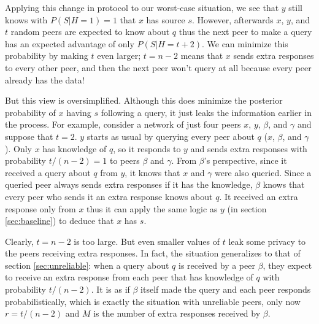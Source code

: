 \documentclass{article}
\newcommand{\secref}[1]{section \ref{sec:#1}}
\begin{document}
Applying this change in protocol to our worst-case situation, we see that $y$
still knows with $P(S|H=1)=1$ that $x$ has source $s$. However, afterwards $x$,
$y$, and $t$ random peers are expected to know about $q$ thus the next peer
to make a query has an expected advantage of only $P(S|H=t+2)$. We can minimize this
probability by making $t$ even larger; $t=n-2$ means that $x$ sends extra
responses to every other peer, and then the next peer won't query at all because
every peer already has the data!

But this view is oversimplified. Although this does minimize the posterior
probability of $x$ having $s$ following a query, it just leaks the
information earlier in the process. For example, consider a network of just four
peers $x$, $y$, $\beta$, and $\gamma$ and suppose that $t=2$. $y$ starts as usual by
querying every peer about $q$ ($x$, $\beta$, and $\gamma$). Only $x$ has knowledge of
$q$, so it responds to $y$ and sends extra responses with probability
$t/(n-2)=1$ to peers $\beta$ and $\gamma$. From $\beta$'s perspective, since it received a
query about $q$ from $y$, it knows that $x$ and $\gamma$ were also queried. Since a
queried peer always sends extra responses if it has the knowledge, $\beta$ knows that
every peer who sends it an extra response knows about $q$. It received an extra
response only from $x$ thus it can apply the same logic as $y$ (in
\secref{baseline}) to deduce that $x$ has $s$.

Clearly, $t=n-2$ is too large. But even smaller values of $t$ leak some privacy to the
peers receiving extra responses. In fact, the situation generalizes to that of
\secref{unreliable}: when a query about $q$ is received by a peer $\beta$,
they expect to receive an extra response from each peer that has knowledge of
$q$ with probability $t/(n-2)$. It is as if $\beta$ itself made the query and each
peer responds probabilistically, which is exactly the situation with unreliable
peers, only now $r=t/(n-2)$ and $M$ is the number of extra responses received by
$\beta$.
\end{document}
